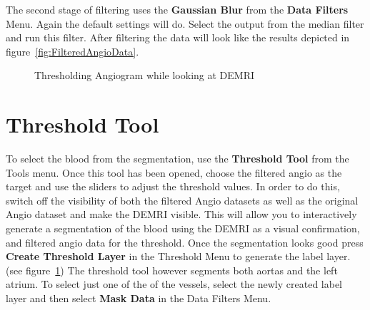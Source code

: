 \documentclass[fleqn,11pt,openany]{book}
\begin{document}
The second stage of filtering uses the {\bf Gaussian Blur} from the {\bf Data Filters} Menu. Again the default settings will do. Select the output from the median filter and run this filter. After filtering the data will look like the results depicted in figure~\ref{fig:FilteredAngioData}.

\begin{figure}
\caption{Thresholding Angiogram while looking at DEMRI}\label{fig:ThresholdAngio}
\end{figure}

\section{Threshold Tool}

To select the blood from the segmentation, use the {\bf Threshold Tool} from the Tools menu. Once this tool has been opened, choose the filtered angio as the target and use the sliders to adjust the threshold values. In order to do this, switch off the visibility of both the filtered Angio datasets as well as the original Angio dataset and make the DEMRI visible. This will allow you to  interactively generate a segmentation of the blood using the DEMRI as a visual confirmation, and filtered angio data for the threshold.  Once the segmentation looks good press {\bf Create Threshold Layer} in the Threshold Menu to generate the label layer. (see figure~\ref{fig:ThresholdAngio}) The threshold tool however segments both aortas and the left atrium. To select just one of the of the vessels, select the newly created label layer and then select {\bf Mask Data} in the Data Filters Menu.
\end{document}
